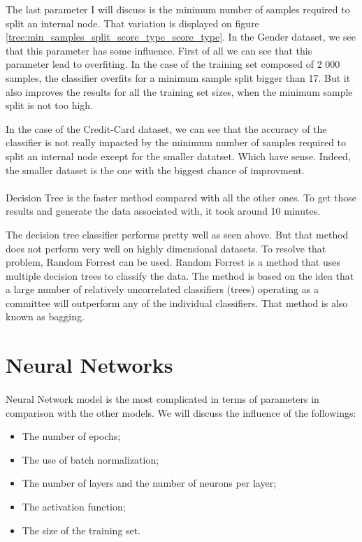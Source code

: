 \documentclass[10pt]{article}
\begin{document}
			The last parameter I will discuss is the minimum number of samples required to split an internal node. That variation is displayed on figure \ref{tree:min_samples_split_score_type_score_type}.
			In the Gender dataset, we see that this parameter has some influence. First of all we can see that this parameter lead to overfiting. In the case of the training set composed of 2 000 samples, the classifier overfits for a minimum sample split bigger than 17. But it also improves the results for all the training set sizes, when the minimum sample split is not too high.

			In the case of the Credit-Card dataset, we can see that the accuracy of the classifier is not really impacted by the minimum number of samples required to split an internal node except for the smaller datatset. Which have sense. Indeed, the smaller dataset is the one with the biggest chance of improvment.
		\paragraph*{}
			Decision Tree is the faster method compared with all the other ones. To get those results and generate the data associated with, it took around 10 minutes.

			The decision tree classifier performs pretty well as seen above. But that method does not perform very well on highly dimensional datasets. To resolve that problem, Random Forrest can be used. Random Forrest is a method that uses multiple decision trees to classify the data. The method is based on the idea that a large number of relatively uncorrelated classifiers (trees) operating as a committee will outperform any of the individual classifiers. That method is also known as bagging.
	\section{Neural Networks}
		\paragraph*{}
			Neural Network model is the most complicated in terms of parameters in comparison with the other models. We will discuss the influence of the followings:
			\begin{itemize}
				\item The number of epochs;
				\item The use of batch normalization;
				\item The number of layers and the number of neurons per layer;
				\item The activation function;
				\item The size of the training set.
			\end{itemize}
\end{document}
